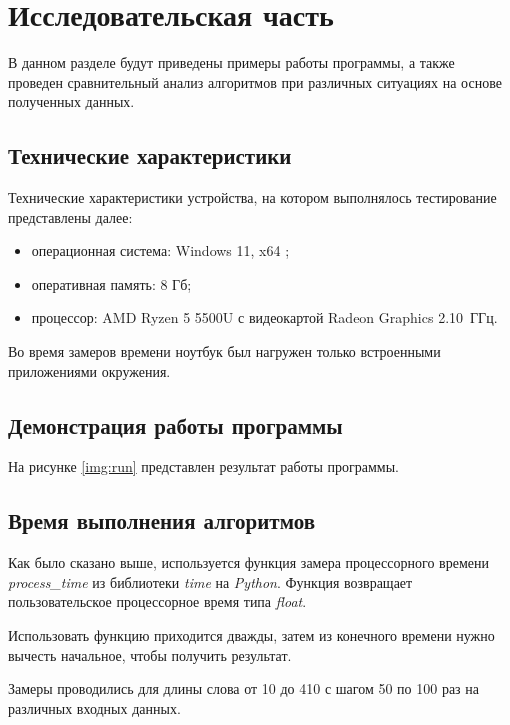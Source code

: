 \chapter{Исследовательская часть}

В данном разделе будут приведены примеры работы программы, а также проведен сравнительный анализ алгоритмов при различных ситуациях на основе полученных данных.

\section{Технические характеристики}

Технические характеристики устройства, на котором выполнялось тестирование представлены далее:
\begin{itemize}[label={---}]
	\item операционная система: Windows 11, x64 \cite{w11};
	\item оперативная память: 8 Гб;
	\item процессор: AMD Ryzen 5 5500U с видеокартой Radeon Graphics 2.10~ГГц.
\end{itemize}

Во время замеров времени ноутбук был нагружен только встроенными приложениями окружения.

\section{Демонстрация работы программы}

На рисунке \ref{img:run} представлен результат работы программы.

\clearpage

\section{Время выполнения алгоритмов}

Как было сказано выше, используется функция замера процессорного времени \textit{process\_time} из библиотеки \textit{time} на \textit{Python}. Функция возвращает пользовательское процессорное время типа \textit{float}.

Использовать функцию приходится дважды, затем из конечного времени нужно вычесть начальное, чтобы получить результат.

Замеры проводились для длины слова от 10 до 410 с шагом 50 по 100 раз на различных входных данных.

